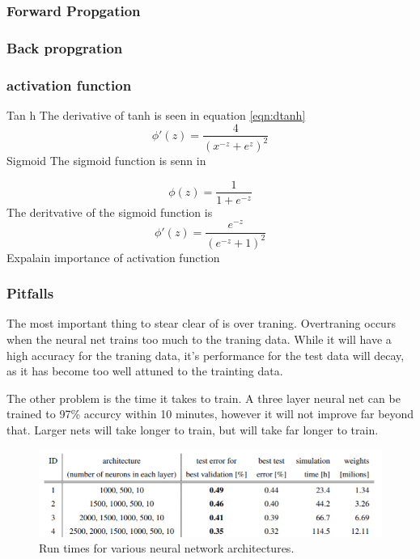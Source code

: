 \documentclass[12pt]{article}
\begin{document}
	\subsubsection{Forward Propgation}
	\subsubsection{Back propgration}
	
	\subsubsection{activation function}
	
	Tan h
	The derivative of tanh is seen in equation \ref{eqn:dtanh}
	\begin{equation}
	\phi'(z)=\frac{4}{\left(x^{-z}+e^{z}\right)^2}
	\label{eqn:dtanh}
	\end{equation}
	Sigmoid
	The sigmoid function is senn in 
	
	
	\begin{equation}
	\phi(z)=\frac{1}{1+e^{-z}}
	\label{eqn:sig}
	\end{equation}
	The deritvative of the sigmoid function is
	\begin{equation}
	\phi'(z)=\frac{e^{-z}}{\left(e^{-z}+1\right)^2}
	\end{equation}
	Expalain importance of activation function
	
	\subsubsection{Pitfalls}
	The most important thing to stear clear of is over traning. Overtraning occurs when the neural net trains too much to the traning data. While it will have a high accuracy for the traning data, it's performance for the test data will decay, as it has become too well attuned to the trainting data.  \par 
	
	The other problem is the time it takes to train. A three layer neural net can be trained to 97\% accurcy within 10 minutes, however it will not improve far beyond that. Larger nets will take longer to train, but will take far longer to train. 
	
	\begin{figure}
		\centering
		\includegraphics[width=0.7\linewidth]{nnRunTime}
		\caption{Run times for various neural network architectures\cite{deepBig}.}
		\label{fig:nnruntime}
	\end{figure}
	
\end{document}
